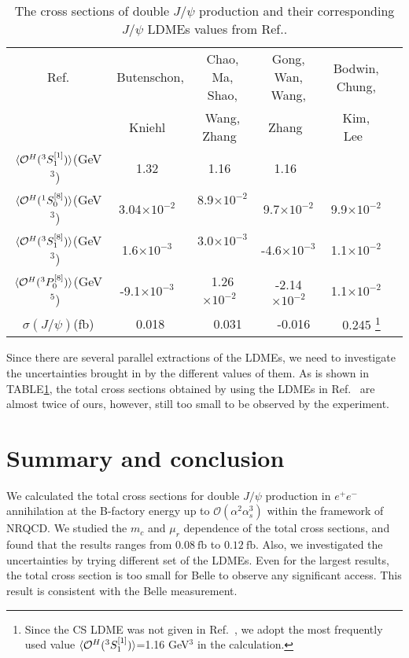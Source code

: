 \documentclass[preprint,showpacs,preprintnumbers,amssymb,aps]{revtex4}
\def\fb{\mathrm{~fb}}
\begin{document}
\begin{table}[htbp]
\begin{center}
\caption{
\label{tab:ldme}
The cross sections of double $J/\psi$ production and their corresponding $J/\psi$ LDMEs values from Ref.\cite{Butenschoen:2011yh,Chao:2012iv,Gong:2012ug,Bodwin:2014gia}.
}
\begin{tabular}{cccccc}
\hline
\hline
Ref.&Butenschon,&Chao, Ma, Shao,&Gong, Wan, Wang,&Bodwin, Chung, \\
&Kniehl~\cite{Butenschoen:2011yh}&Wang, Zhang~\cite{Chao:2012iv}&Zhang~\cite{Gong:2012ug}&Kim, Lee~\cite{Bodwin:2014gia} \\
\hline
$\langle{\cal O}^{H}(^{3}S^{[1]}_{1})\rangle$(GeV$^3$)~&1.32~&1.16~&1.16~&   \\
$\langle{\cal O}^{H}(^{1}S^{[8]}_{0})\rangle$(GeV$^3$)~&3.04$\times10^{-2}$~& 8.9$\times10^{-2}$~&9.7$\times10^{-2}$&9.9$\times10^{-2}$  \\
$\langle{\cal O}^{H}(^{3}S^{[8]}_{1})\rangle$(GeV$^3$)~&1.6$\times10^{-3}$~& 3.0$\times10^{-3}$~&-4.6$\times10^{-3}$&1.1$\times10^{-2}$ &   \\
$\langle{\cal O}^{H}(^{3}P^{[8]}_{0})\rangle$(GeV$^5$)~&-9.1$\times10^{-3}$~& 1.26$\times10^{-2}$~&-2.14$\times10^{-2}$& 1.1$\times10^{-2}$ \\
\hline
$\sigma(J/\psi)$(fb)& 0.018&~ 0.031&~ -0.016 &~ 0.245
\footnote[1]{Since the CS LDME was not given in Ref.~\cite{Bodwin:2014gia}, we adopt the most frequently used value $\langle{\cal O}^{H}(^{3}S^{[1]}_{1})\rangle$=1.16 GeV$^3$ in the calculation.}  \\
\hline
\hline
\end{tabular}
\end{center}
\end{table}

Since there are several parallel extractions of the LDMEs, we need to investigate the uncertainties brought in by the different values of them.
As is shown in TABLE\ref{tab:ldme}, the total cross sections obtained by using the LDMEs in Ref.~\cite{Bodwin:2014gia} are almost twice of ours,
however, still too small to be observed by the experiment.

\section{Summary and conclusion}\label{cha:4}


We calculated the total cross sections for double $J/\psi$ production in $e^+e^-$ annihilation at the B-factory energy up to $\mathcal{O}(\alpha^2\alpha_s^3)$ within the framework of NRQCD.
We studied the $m_c$ and $\mu_r$ dependence of the total cross sections,
and found that the results ranges from $0.08\fb$ to $0.12\fb$.
Also, we investigated the uncertainties by trying different set of the LDMEs.
Even for the largest results, the total cross section is too small for Belle to observe any significant access.
This result is consistent with the Belle measurement.
\end{document}
